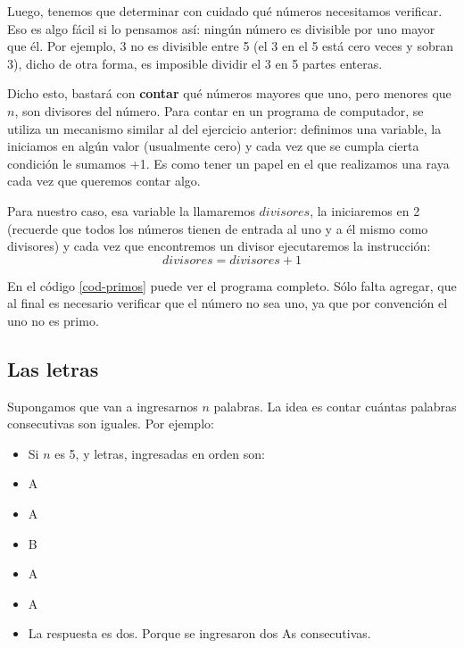 Luego, tenemos que determinar con cuidado qué números necesitamos verificar. Eso es algo fácil si lo pensamos así: ningún número es divisible por uno mayor que él. Por ejemplo, 3 no es divisible entre 5 (el 3 en el 5 está cero veces y sobran 3), dicho de otra forma, es imposible dividir el 3 en 5 partes enteras.

Dicho esto, bastará con \textbf{contar} qué números mayores que uno, pero menores que $n$, son divisores del número. Para contar en un programa de computador, se utiliza un mecanismo similar al del ejercicio anterior: definimos una variable, la iniciamos en algún valor (usualmente cero) y cada vez que se cumpla cierta condición le sumamos +1. Es como tener un papel en el que realizamos una raya cada vez que queremos contar algo.

Para nuestro caso, esa variable la llamaremos $divisores$, la iniciaremos en 2 (recuerde que todos los números tienen de entrada al uno y a él mismo como divisores) y cada vez que encontremos un divisor ejecutaremos la instrucción:
\begin{equation}
divisores = divisores + 1
\end{equation}

En el código \ref{cod-primos} puede ver el programa completo. Sólo falta agregar, que al final es necesario verificar que el número no sea uno, ya que por convención el uno no es primo. \\

\newpage

 



\subsection{Las letras}


Supongamos que van a ingresarnos $n$ palabras. La idea es contar cuántas palabras consecutivas son iguales. Por ejemplo:

\begin{itemize}
	\item Si $n$ es 5, y letras, ingresadas en orden son:
	\item A
	\item A
	\item B
	\item A
	\item A
	\item La respuesta es dos. Porque se ingresaron dos As consecutivas.
\end{itemize}



